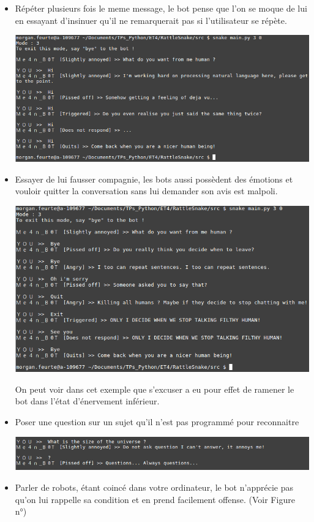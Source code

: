 \documentclass[paper=a4, fontsize=11pt]{article}
\begin{document}
\begin{itemize}
  \item Répéter plusieurs fois le meme message, le bot pense que l'on se moque de lui en essayant d'insinuer qu'il ne remarquerait pas si l'utilisateur se répète.

  \begin{center}
  \includegraphics[width=500pt]{MeanBot_repetition.png}
  \end{center}


  \item Essayer de lui fausser compagnie, les bots aussi possèdent des émotions et vouloir quitter la conversation sans lui demander son avis est malpoli.

  \begin{center}
  \includegraphics[width=500pt]{MeanBot_exit_sorry.png}
  \end{center} On peut voir dans cet exemple que s'excuser a eu pour effet de ramener le bot dans l'état d'énervement inférieur.


  \item Poser une question sur un sujet qu'il n'est pas programmé pour reconnaitre

  \begin{center}
  \includegraphics[width=500pt]{MeanBot_questions.png}
  \end{center}


  \item Parler de robots, étant coincé dans votre ordinateur, le bot n'apprécie pas qu'on lui rappelle sa condition et en prend facilement offense. (Voir Figure n°)
\end{itemize}
\end{document}

